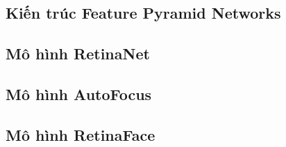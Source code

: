 {    \subsection{Kiến trúc Feature Pyramid Networks}
    
    \fpn

    \subsection{Mô hình RetinaNet}
    
    \retinanet

    \subsection{Mô hình AutoFocus}
    
    \autofocus

    \subsection{Mô hình RetinaFace}
    
    \retinaface
}